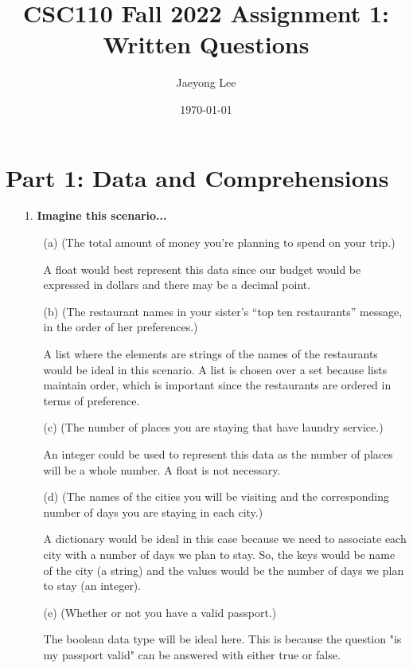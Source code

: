 \documentclass[12pt]{article}
\title{CSC110 Fall 2022 Assignment 1: Written Questions}
\author{Jaeyong Lee}
\date{\today}
\begin{document}
\maketitle

\section*{Part 1: Data and Comprehensions}

\begin{enumerate}
\item[1.] \textbf{Imagine this scenario...}
\begin{enumerate}
\item[(a)] (The total amount of money you're planning to spend on your trip.)

A float would best represent this data since our budget would be expressed in dollars and there may be a decimal point.

\item[(b)] (The restaurant names in your sister's ``top ten restaurants'' message, in the order of her preferences.)

A list where the elements are strings of the names of the restaurants would be ideal in this scenario. A list is chosen over a set because lists maintain order, which is important since the restaurants are ordered in terms of preference. 

\item[(c)] (The number of places you are staying that have laundry service.)

An integer could be used to represent this data as the number of places will be a whole number. A float is not necessary. 

\item[(d)] (The names of the cities you will be visiting and the corresponding number of days you are staying in each city.)

A dictionary would be ideal in this case because we need to associate each city with a number of days we plan to stay. So, the keys would be name of the city (a string) and the values would be the number of days we plan to stay (an integer). 

\item[(e)] (Whether or not you have a valid passport.)

The boolean data type will be ideal here. This is because the question "is my passport valid" can be answered with either true or false. 
\end{enumerate}


\end{enumerate}
\end{document}
